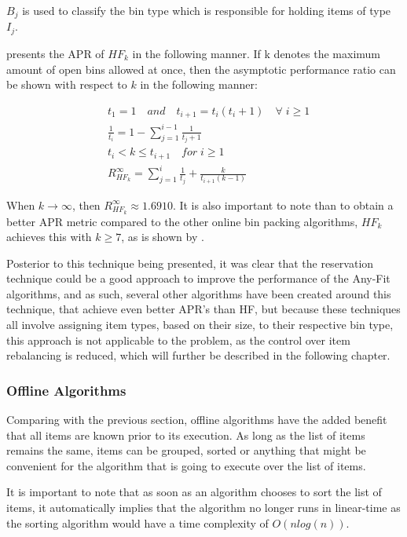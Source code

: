 $B_j$ is used to classify the bin type which is responsible for holding items of type $I_j$.

\cite{lee1985simple} presents the APR of $HF_k$ in the following manner. If k denotes the maximum amount of open bins allowed at once, then the asymptotic performance ratio can be shown with respect to $k$ in the following manner:

\begin{align}
    & t_1 = 1 \quad and \quad t_{i+1} = t_i(t_i + 1) \quad \forall \; i \geq 1 \\
    & \frac{1}{t_i} = 1 - \sum_{j=1}^{i-1} \frac{1}{t_j + 1} \\
    & t_i < k \leq t_{i+1} \quad for \; i \geq 1 \\
    & R_{HF_k}^\infty = \sum_{j=1}^{i} \frac{1}{t_j} + \frac{k}{t_{i+1}(k-1)}
\end{align}

When $k \to \infty$, then $R_{HF_k}^\infty \approx 1.6910$. It is also important to note than to obtain a better APR metric compared to the other online bin packing algorithms, $HF_k$ achieves this with $k \geq 7$, as is shown by \cite{lee1985simple}.

Posterior to this technique being presented, it was clear that the reservation technique could be a good approach to improve the performance of the Any-Fit algorithms, and as such, several other algorithms have been created around this technique, that achieve even better APR's than HF, but because these techniques all involve assigning item types, based on their size, to their respective bin type, this approach is not applicable to the problem, as the control over item rebalancing is reduced, which will further be described in the following chapter.



\subsubsection{Offline Algorithms}

Comparing with the previous section, offline algorithms have the added benefit that all items are known prior to its execution. As long as the list of items remains the same, items can be grouped, sorted or anything that might be convenient for the algorithm that is going to execute over the list of items. 

It is important to note that as soon as an algorithm chooses to sort the list of items, it automatically implies that the algorithm no longer runs in linear-time as the sorting algorithm would have a time complexity of $O(n log(n))$.

